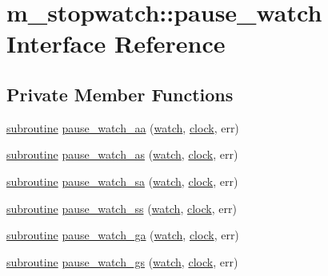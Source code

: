 \hypertarget{interfacem__stopwatch_1_1pause__watch}{}\section{m\+\_\+stopwatch\+:\+:pause\+\_\+watch Interface Reference}
\label{interfacem__stopwatch_1_1pause__watch}
\subsection*{Private Member Functions}
\begin{DoxyCompactItemize}
\item 
\hyperlink{M__stopwatch_83_8txt_acfbcff50169d691ff02d4a123ed70482}{subroutine} \hyperlink{interfacem__stopwatch_1_1pause__watch_a25eb00588b156d2365959dba3f94c12d}{pause\+\_\+watch\+\_\+aa} (\hyperlink{read__watch_83_8txt_ad2129669fa47b8899641309620add095}{watch}, \hyperlink{stop__watch_83_8txt_a148c035b430d6edf5413dbd2704facfb}{clock}, err)
\item 
\hyperlink{M__stopwatch_83_8txt_acfbcff50169d691ff02d4a123ed70482}{subroutine} \hyperlink{interfacem__stopwatch_1_1pause__watch_ae80c28ea733118509d6b9ab13f77c4ac}{pause\+\_\+watch\+\_\+as} (\hyperlink{read__watch_83_8txt_ad2129669fa47b8899641309620add095}{watch}, \hyperlink{stop__watch_83_8txt_a148c035b430d6edf5413dbd2704facfb}{clock}, err)
\item 
\hyperlink{M__stopwatch_83_8txt_acfbcff50169d691ff02d4a123ed70482}{subroutine} \hyperlink{interfacem__stopwatch_1_1pause__watch_aceb7f5bcc23b923a848ac5ab01909ec7}{pause\+\_\+watch\+\_\+sa} (\hyperlink{read__watch_83_8txt_ad2129669fa47b8899641309620add095}{watch}, \hyperlink{stop__watch_83_8txt_a148c035b430d6edf5413dbd2704facfb}{clock}, err)
\item 
\hyperlink{M__stopwatch_83_8txt_acfbcff50169d691ff02d4a123ed70482}{subroutine} \hyperlink{interfacem__stopwatch_1_1pause__watch_abc7e10bbde557d68d45fc4290cd798f7}{pause\+\_\+watch\+\_\+ss} (\hyperlink{read__watch_83_8txt_ad2129669fa47b8899641309620add095}{watch}, \hyperlink{stop__watch_83_8txt_a148c035b430d6edf5413dbd2704facfb}{clock}, err)
\item 
\hyperlink{M__stopwatch_83_8txt_acfbcff50169d691ff02d4a123ed70482}{subroutine} \hyperlink{interfacem__stopwatch_1_1pause__watch_a4410e605e76aef2a8ab74fc546087dd1}{pause\+\_\+watch\+\_\+ga} (\hyperlink{read__watch_83_8txt_ad2129669fa47b8899641309620add095}{watch}, \hyperlink{stop__watch_83_8txt_a148c035b430d6edf5413dbd2704facfb}{clock}, err)
\item 
\hyperlink{M__stopwatch_83_8txt_acfbcff50169d691ff02d4a123ed70482}{subroutine} \hyperlink{interfacem__stopwatch_1_1pause__watch_a77cdba59f1ec8de029d5e3fe0cd44e73}{pause\+\_\+watch\+\_\+gs} (\hyperlink{read__watch_83_8txt_ad2129669fa47b8899641309620add095}{watch}, \hyperlink{stop__watch_83_8txt_a148c035b430d6edf5413dbd2704facfb}{clock}, err)
\end{DoxyCompactItemize}


